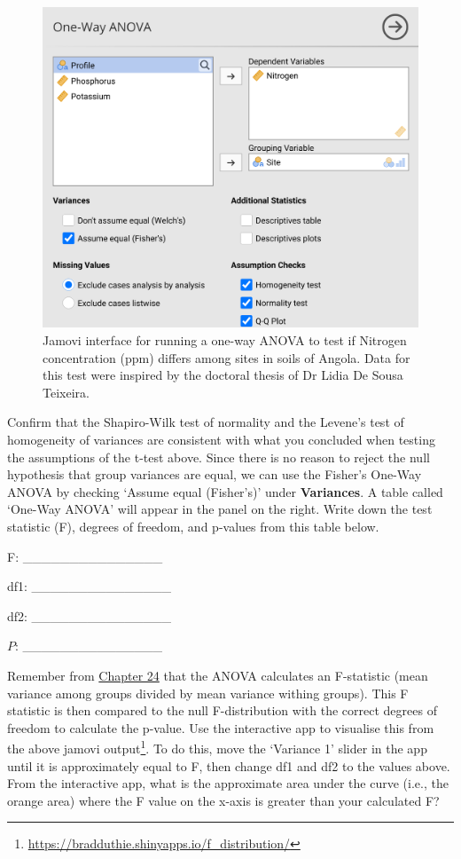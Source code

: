 \documentclass[
  openany]{krantz}
\begin{document}
\begin{figure}
\includegraphics[width=1\linewidth]{img/jamovi_one-way_ANOVA_analysis} \caption{Jamovi interface for running a one-way ANOVA to test if Nitrogen concentration (ppm) differs among sites in soils of Angola. Data for this test were inspired by the doctoral thesis of Dr Lidia De Sousa Teixeira.}\label{fig:unnamed-chunk-112}
\end{figure}

Confirm that the Shapiro-Wilk test of normality and the Levene's test of homogeneity of variances are consistent with what you concluded when testing the assumptions of the t-test above.
Since there is no reason to reject the null hypothesis that group variances are equal, we can use the Fisher's One-Way ANOVA by checking `Assume equal (Fisher's)' under \textbf{Variances}.
A table called `One-Way ANOVA' will appear in the panel on the right.
Write down the test statistic (F), degrees of freedom, and p-values from this table below.

F: \_\_\_\_\_\_\_\_\_\_\_\_\_\_\_

df1: \_\_\_\_\_\_\_\_\_\_\_\_\_\_\_

df2: \_\_\_\_\_\_\_\_\_\_\_\_\_\_\_

\(P\): \_\_\_\_\_\_\_\_\_\_\_\_\_\_\_

Remember from \protect\hyperlink{Chapter_24}{Chapter 24} that the ANOVA calculates an F-statistic (mean variance among groups divided by mean variance withing groups).
This F statistic is then compared to the null F-distribution with the correct degrees of freedom to calculate the p-value.
Use the interactive app to visualise this from the above jamovi output\footnote{\url{https://bradduthie.shinyapps.io/f_distribution/}}.
To do this, move the `Variance 1' slider in the app until it is approximately equal to F, then change df1 and df2 to the values above.
From the interactive app, what is the approximate area under the curve (i.e., the orange area) where the F value on the x-axis is greater than your calculated F?
\end{document}
